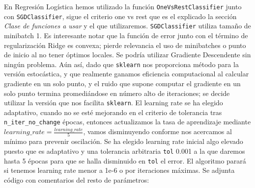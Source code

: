 \documentclass[11pt,a4paper]{article}
\theoremstyle{definition}
\begin{document}
	En Regresión Logística hemos utilizado la función \texttt{OneVsRestClassifier} junto con \texttt{SGDClassifier}, sigue el criterio one vs rest que es el explicado la sección \textit{Clase de funciones a usar} y el que utilizaremos. \texttt{SGDClassifier} utiliza tamaño de minibatch 1. Es interesante notar que la función de error junto con el término de regularización Ridge es convexa; pierde relevancia el uso de minibatches o punto de inicio al no tener óptimos locales. Se podría utilizar Gradiente Descendente sin ningún problema. Aún así, dado que \texttt{sklearn} nos proporciona método para la versión estocástica, y que realmente ganamos eficiencia computacional al calcular gradiente en un solo punto, y el ruido que supone computar el gradiente en un solo punto termina promediándose en número alto de iteraciones; se decide utilizar la versión que nos facilita \texttt{sklearn}. El learning rate se ha elegido adaptativo, cuando no se esté mejorando en el criterio de tolerancia tras \texttt{n\_iter\_no\_change} épocas, entonces actualizamos la tasa de aprendizaje mediante $learning\_rate =\frac{learning\_rate}{5}$, vamos disminuyendo conforme nos acercamos al mínimo para prevenir oscilación. Se ha elegido learning rate inicial algo elevado puesto que es adaptativo y una tolerancia arbitraria \texttt{tol} 0.001 a la que daremos hasta 5 épocas para que se halla disminuido en \texttt{tol} el error. El algoritmo parará si tenemos learning rate menor a 1e-6 o por iteraciones máximas. Se adjunta código con comentarios del resto de parámetros:
\end{document}
